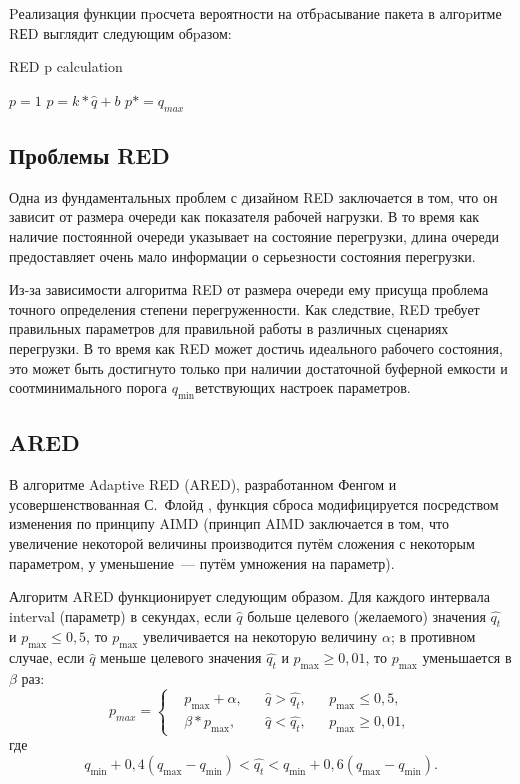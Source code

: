 Pеализация функции пpосчета вероятности на отбpасывание пакета в алгоpитме RЕD
выглядит следующим обpазом:

\begin{algorithm}[H]
	\caption{RED p calculation} 
	\begin{algorithmic}[1]
                \State $p = 1$
            \Else 
              \State $p = k * \hat{q} + b$
              \State $p *= q_{max}$
            \EndIf
	\end{algorithmic} 
\end{algorithm}

\subsection{Проблемы RED}
\label{chap1:sec3:sub3}

Одна из фундаментальных проблем с дизайном RED заключается в том, что он
зависит от размера очереди как показателя рабочей нагрузки. В то время как
наличие постоянной очереди указывает на состояние перегрузки, длина очереди
предоставляет очень мало информации о серьезности состояния перегрузки. 

Из-за зависимости алгоритма RED от размера очереди ему присуща проблема точного
определения степени перегруженности. Как следствие, RED требует
правильных параметров для правильной работы в различных
сценариях перегрузки. В то время как RED может достичь идеального рабочего
состояния, это может быть достигнуто только при наличии достаточной буферной
емкости и соотминимального порога $q_{\min}$ветствующих настроек параметров.



\subsection{ARED}
\label{chap1:sec3:sub4}

В алгоритме Adaptive RED (ARED), разработанном Фенгом
\cite{ARED_1,ARED_2} и усовершенствованная С.~Флойд \cite{ARED_3},
функция сброса модифицируется посредством изменения по принципу AIMD
(принцип AIMD заключается в том, что увеличение некоторой величины
производится путём сложения с некоторым параметром, у уменьшение~---
путём умножения на параметр).

Алгоритм ARED функционирует следующим образом. Для каждого интервала
interval (параметр) в секундах, если $\hat{q}$ больше целевого
(желаемого) значения $\hat{q_t}$ и $p_{\max} \leqslant 0,5$, то $p_{\max}$
увеличивается на некоторую величину $\alpha$; в противном случае, если
$\hat{q}$ меньше целевого значения $\hat{q_t}$ и $p_{\max}\geqslant 0,01$, то
$p_{\max}$ уменьшается в $\beta$ раз:
\[
p_{max} = \left\{
  \begin{aligned}
   & p_{\max}+\alpha, && \hat{q}>\hat{q_{t}}, && p_{\max} \leqslant 0,5, \\
   & \beta * p_{\max}, && \hat{q}<\hat{q_{t}}, && p_{\max} \geqslant 0,01, 
  \end{aligned}
\right.
\]
где
\[
q_{\min}+0,4\left(q_{\max}-q_{\min}\right) < \hat{q_t} < q_{\min}+0,6\left(q_{\max}-q_{\min}\right).
\]


